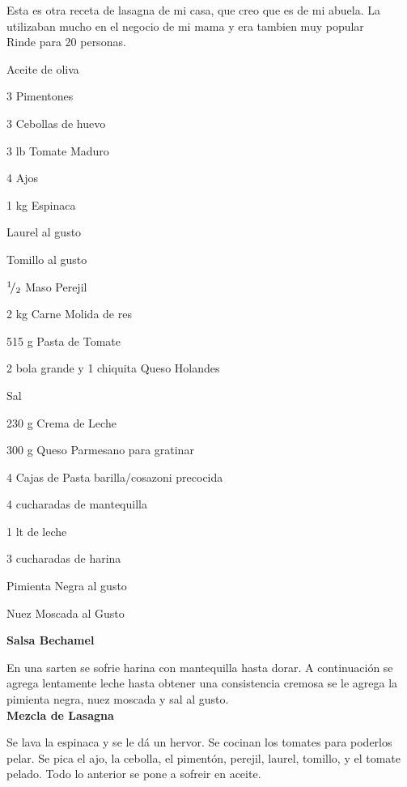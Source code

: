 Esta es otra receta de lasagna de mi casa, que creo que es de mi abuela. La utilizaban mucho en el negocio de mi mama y era tambien muy popular\\

Rinde para 20 personas.

\begin{ingredientes}
\item Aceite de oliva
\item 3 Pimentones
\item 3 Cebollas de huevo
\item 3 lb Tomate Maduro
\item 4 Ajos
\item 1 kg Espinaca
\item Laurel al gusto
\item Tomillo al gusto
\item ${}^{1}\!/_{2}$ Maso Perejil
\item 2 kg Carne Molida de res
\item 515 g Pasta de Tomate
\item 2 bola grande y 1 chiquita Queso Holandes
\item Sal
\item 230 g Crema de Leche
\item 300 g Queso Parmesano para gratinar
\item 4 Cajas de Pasta barilla/cosazoni precocida
\item 4 cucharadas de mantequilla
\item 1 lt de leche
\item 3 cucharadas de harina
\item Pimienta Negra al gusto
\item Nuez Moscada al Gusto
\end{ingredientes}
\newpage
\preparacion

\textbf{Salsa Bechamel}

En una sarten se sofrie harina con mantequilla hasta dorar. A continuación se agrega lentamente leche hasta obtener una consistencia cremosa se le agrega la pimienta negra, nuez moscada y sal al gusto.\\

\textbf{Mezcla de Lasagna}

Se lava la espinaca y se le dá un hervor. Se cocinan los tomates para poderlos pelar. Se pica el ajo, la cebolla, el pimentón, perejil, laurel, tomillo, y el tomate pelado. Todo lo anterior se pone a sofreir en aceite.\\

